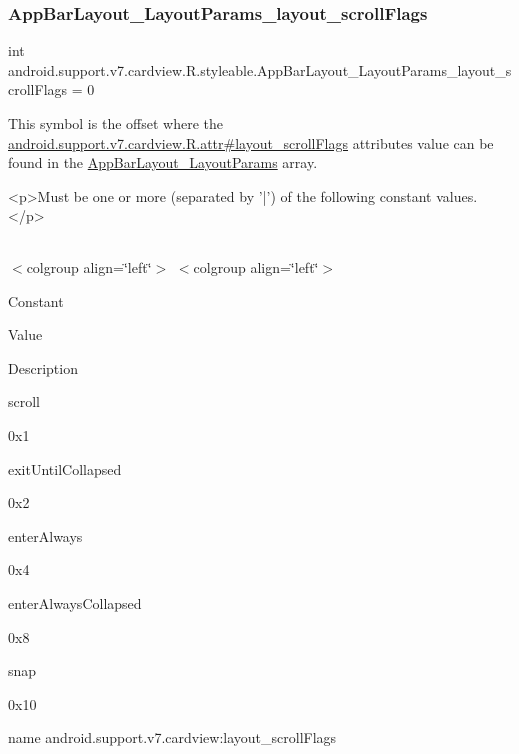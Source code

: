 \subsubsection{\texorpdfstring{App\+Bar\+Layout\+\_\+\+Layout\+Params\+\_\+layout\+\_\+scroll\+Flags}{AppBarLayout\_LayoutParams\_layout\_scrollFlags}}
{\footnotesize\ttfamily int android.\+support.\+v7.\+cardview.\+R.\+styleable.\+App\+Bar\+Layout\+\_\+\+Layout\+Params\+\_\+layout\+\_\+scroll\+Flags = 0\hspace{0.3cm}{\ttfamily [static]}}

This symbol is the offset where the \hyperlink{classandroid_1_1support_1_1v7_1_1cardview_1_1R_1_1attr_a3b3c1117c3a692d7602eb20227ea8e17}{android.\+support.\+v7.\+cardview.\+R.\+attr\#layout\+\_\+scroll\+Flags} attribute\textquotesingle{}s value can be found in the \hyperlink{classandroid_1_1support_1_1v7_1_1cardview_1_1R_1_1styleable_af9edb99ce8a17a0ba323d6a695308d5d}{App\+Bar\+Layout\+\_\+\+Layout\+Params} array.

\begin{DoxyVerb}      <p>Must be one or more (separated by '|') of the following constant values.</p>
\end{DoxyVerb}
 \tabulinesep=1mm
\begin{longtabu} spread 0pt [c]{*{0}{|X[-1]}|}
\hline
\end{longtabu}
$<$colgroup align=\char`\"{}left\char`\"{}$>$ $<$colgroup align=\char`\"{}left\char`\"{}$>$ 

Constant

Value

Description 

{\ttfamily scroll}

0x1

{\ttfamily exit\+Until\+Collapsed}

0x2

{\ttfamily enter\+Always}

0x4

{\ttfamily enter\+Always\+Collapsed}

0x8

{\ttfamily snap}

0x10

name android.\+support.\+v7.\+cardview\+:layout\+\_\+scroll\+Flags \mbox{\label{classandroid_1_1support_1_1v7_1_1cardview_1_1R_1_1styleable_a0de7675ce2c7d78872be858b9691bdb0}} 
